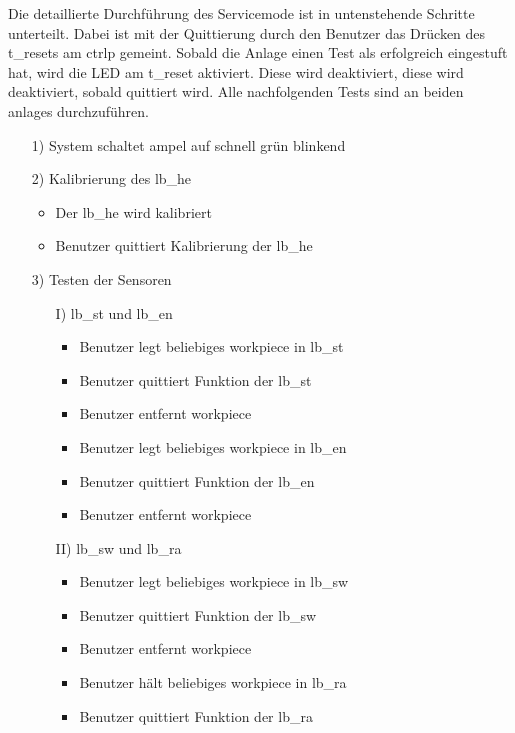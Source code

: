 Die detaillierte Durchführung des Servicemode ist in untenstehende Schritte unterteilt.
Dabei ist mit der Quittierung durch den Benutzer das Drücken des \gls{t_reset}s am \gls{ctrlp} gemeint.
Sobald die Anlage einen Test als erfolgreich eingestuft hat, wird die LED am \gls{t_reset} aktiviert.
Diese wird deaktiviert, diese wird deaktiviert, sobald quittiert wird.
Alle nachfolgenden Tests sind an beiden \glspl{anlage} durchzuführen.
\begin{enumerate}
    \item[1)] System schaltet \gls{ampel} auf schnell grün blinkend
    \item[2)] Kalibrierung des \gls{lb_he}
    \begin{itemize}
        \item Der \gls{lb_he} wird kalibriert
        \item Benutzer quittiert Kalibrierung der \gls{lb_he}
    \end{itemize}
    \item[3)] Testen der Sensoren
    \begin{enumerate}
        \item[I)] \Gls{lb_st} und \gls{lb_en}
        \begin{itemize}
            \item Benutzer legt beliebiges \gls{workpiece} in \gls{lb_st}
            \item Benutzer quittiert Funktion der \gls{lb_st}
            \item Benutzer entfernt \gls{workpiece}
            \item Benutzer legt beliebiges \gls{workpiece} in \gls{lb_en}
            \item Benutzer quittiert Funktion der \gls{lb_en}
            \item Benutzer entfernt \gls{workpiece}
        \end{itemize}
        \item[II)] \Gls{lb_sw} und \gls{lb_ra}
        \begin{itemize}
            \item Benutzer legt beliebiges \gls{workpiece} in \gls{lb_sw}
            \item Benutzer quittiert Funktion der \gls{lb_sw}
            \item Benutzer entfernt \gls{workpiece}
            \item Benutzer hält beliebiges \gls{workpiece} in \gls{lb_ra}
            \item Benutzer quittiert Funktion der \gls{lb_ra}

\end{itemize}
\end{enumerate}
\end{enumerate}
